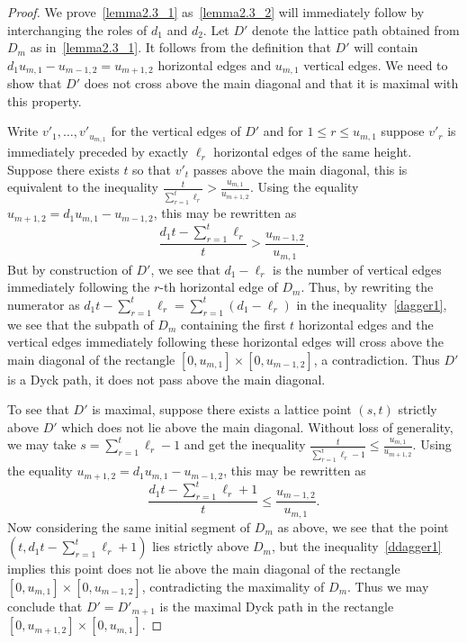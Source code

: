 \documentclass[ALCO,ThmDefs,Unicode,epreuves]{cedram}
\begin{document}
\begin{proof}
 We prove~\ref{lemma2.3_1} as~\ref{lemma2.3_2} will immediately follow by interchanging the roles of $d_1$ and $d_2$. 
 Let $D'$ denote the lattice path obtained from $D_m$ as in~\ref{lemma2.3_1}. 
 It follows from the definition that $D'$ will contain $d_1u_{m,1}-u_{m-1,2}=u_{m+1,2}$ horizontal edges and $u_{m,1}$ vertical edges. 
 We need to show that $D'$ does not cross above the main diagonal and that it is maximal with this property. 

 Write $v'_1,\ldots,v'_{u_{m,1}}$ for the vertical edges of $D'$ and for $1\le r\le u_{m,1}$ suppose $v'_r$ is immediately preceded by exactly $\ell_r$ horizontal edges of the same height.
 Suppose there exists $t$ so that $v'_t$ passes above the main diagonal, this is equivalent to the inequality $\frac{t}{\sum\limits_{r=1}^t\ell_r}>\frac{u_{m,1}}{u_{m+1,2}}$. 
 Using the equality $u_{m+1,2}=d_1u_{m,1}-u_{m-1,2}$, this may be rewritten as 
 \begin{equation}\label{dagger1}
 \tag{$\dagger$}\frac{d_1t-\sum\limits_{r=1}^t\ell_r}{t}>\frac{u_{m-1,2}}{u_{m,1}}.
 \end{equation}
 But by construction of $D'$, we see that $d_1-\ell_r$ is the number of vertical edges immediately following the $r$-th horizontal edge of $D_m$. 
 Thus, by rewriting the numerator as $d_1t-\sum\limits_{r=1}^t\ell_r=\sum\limits_{r=1}^t(d_1-\ell_r)$ in the inequality~\eqref{dagger1}, we see that the subpath of $D_m$ containing the first $t$ horizontal edges and the vertical edges immediately following these horizontal edges will cross above the main diagonal of the rectangle $[0,u_{m,1}]\times[0,u_{m-1,2}]$, a contradiction. 
 Thus $D'$ is a Dyck path, \ie it does not pass above the main diagonal.

 To see that $D'$ is maximal, suppose there exists a lattice point $(s,t)$ strictly above $D'$ which does not lie above the main diagonal. 
 Without loss of generality, we may take $s=\sum\limits_{r=1}^t\ell_r-1$ and get the inequality $\frac{t}{\sum\limits_{r=1}^t\ell_r-1}\le\frac{u_{m,1}}{u_{m+1,2}}$. 
 Using the equality $u_{m+1,2}=d_1u_{m,1}-u_{m-1,2}$, this may be rewritten as
 \begin{equation}\label{ddagger1}
 \tag{$\ddagger$}\frac{d_1t-\sum\limits_{r=1}^t\ell_r+1}{t}\le\frac{u_{m-1,2}}{u_{m,1}}.
 \end{equation}
 Now considering the same initial segment of $D_m$ as above, we see that the point $(t,d_1t-\sum\limits_{r=1}^t\ell_r+1)$ lies strictly above $D_m$, but the inequality~\eqref{ddagger1} implies this point does not lie above the main diagonal of the rectangle $[0,u_{m,1}]\times[0,u_{m-1,2}]$, contradicting the maximality of $D_m$. 
 Thus we may conclude that $D'=D'_{m+1}$ is the maximal Dyck path in the rectangle $[0,u_{m+1,2}]\times[0,u_{m,1}]$.
\end{proof}
\end{document}
